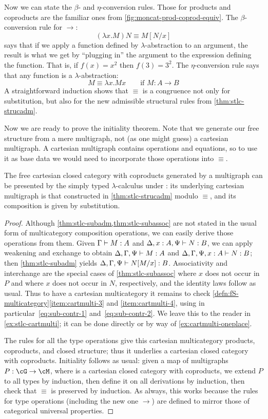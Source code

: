 Now we can state the $\beta$- and $\eta$-conversion rules.
Those for products and coproducts are the familiar ones from \cref{fig:moncat-prod-coprod-equiv}.
The $\beta$-conversion rule for $\to$:
\[ (\lambda x.M)N \equiv M[N/x]\]
says that if we apply a function defined by $\lambda$-abstraction to an argument, the result is what we get by ``plugging in'' the argument to the expression defining the function.
That is, if $f(x)=x^2$ then $f(3) = 3^2$.
The $\eta$-conversion rule says that any function is a $\lambda$-abstraction:
\[  M \equiv \lambda x.Mx \qquad \text{if } M:A\to B\]
A straightforward induction shows that $\equiv$ is a congruence not only for substitution, but also for the new admissible structural rules from \cref{thm:stlc-strucadm}.

Now we are ready to prove the initiality theorem.
Note that we generate our free structure from a mere multigraph, not (as one might guess) a cartesian multigraph.
A cartesian multigraph contains operations and equations, so to use it as base data we would need to incorporate those operations into $\equiv$.

\begin{thm}\label{thm:stlc-initial}
  The free cartesian closed category with coproducts generated by a multigraph \cG can be presented by the simply typed $\lambda$-calculus under \cG: its underlying cartesian multigraph is that constructed in \cref{thm:stlc-strucadm} modulo $\equiv$, and its composition is given by substitution.
\end{thm}
\begin{proof}
  Although \cref{thm:stlc-subadm,thm:stlc-subassoc} are not stated in the usual form of multicategory composition operations, we can easily derive those operations from them.
  Given $\Gamma\vdash M:A$ and $\Delta,x:A,\Psi\vdash N:B$, we can apply weakening and exchange to obtain $\Delta,\Gamma,\Psi\vdash M:A$ and $\Delta,\Gamma,\Psi,x:A\vdash N:B$; then \cref{thm:stlc-subadm} yields $\Delta,\Gamma,\Psi\vdash N[M/x]:B$.
  Associativity and interchange are the special cases of \cref{thm:stlc-subassoc} where $x$ does not occur in $P$ and where $x$ does not occur in $N$, respectively, and the identity laws follow as usual.
  Thus to have a cartesian multicategory it remains to check \cref{defn:fS-multicategory}\ref{item:cartmulti-3} and \ref{item:cartmulti-4}, using in particular~\eqref{eq:sub-contr-1} and~\eqref{eq:sub-contr-2}.
  We leave this to the reader in \cref{ex:stlc-cartmulti}; it can be done directly or by way of \cref{ex:cartmulti-oneplace}.

  The rules for all the type operations give this cartesian multicategory products, coproducts, and closed structure; thus it underlies a cartesian closed category with coproducts.
  Initiality follows as usual: given a map of multigraphs $P:\cG\to \cM$, where \cM is a cartesian closed category with coproducts, we extend $P$ to all types by induction, then define it on all derivations by induction, then check that $\equiv$ is preserved by induction.
  As always, this works because the rules for type operations (including the new one $\to$) are defined to mirror those of categorical universal properties.
\end{proof}

